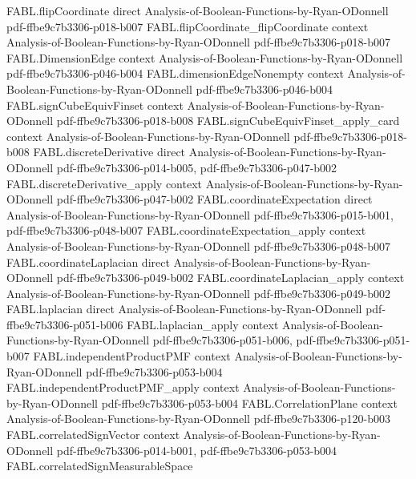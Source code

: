 \begin{theorem}
\proofstep
  {FABL.flipCoordinate}
  {direct}
  {Analysis-of-Boolean-Functions-by-Ryan-ODonnell}
  {pdf-ffbe9c7b3306-p018-b007}
\proofstep
  {FABL.flipCoordinate_flipCoordinate}
  {context}
  {Analysis-of-Boolean-Functions-by-Ryan-ODonnell}
  {pdf-ffbe9c7b3306-p018-b007}
\proofstep
  {FABL.DimensionEdge}
  {context}
  {Analysis-of-Boolean-Functions-by-Ryan-ODonnell}
  {pdf-ffbe9c7b3306-p046-b004}
\proofstep
  {FABL.dimensionEdgeNonempty}
  {context}
  {Analysis-of-Boolean-Functions-by-Ryan-ODonnell}
  {pdf-ffbe9c7b3306-p046-b004}
\proofstep
  {FABL.signCubeEquivFinset}
  {context}
  {Analysis-of-Boolean-Functions-by-Ryan-ODonnell}
  {pdf-ffbe9c7b3306-p018-b008}
\proofstep
  {FABL.signCubeEquivFinset_apply_card}
  {context}
  {Analysis-of-Boolean-Functions-by-Ryan-ODonnell}
  {pdf-ffbe9c7b3306-p018-b008}
\proofstep
  {FABL.discreteDerivative}
  {direct}
  {Analysis-of-Boolean-Functions-by-Ryan-ODonnell}
  {pdf-ffbe9c7b3306-p014-b005,
    pdf-ffbe9c7b3306-p047-b002}
\proofstep
  {FABL.discreteDerivative_apply}
  {context}
  {Analysis-of-Boolean-Functions-by-Ryan-ODonnell}
  {pdf-ffbe9c7b3306-p047-b002}
\proofstep
  {FABL.coordinateExpectation}
  {direct}
  {Analysis-of-Boolean-Functions-by-Ryan-ODonnell}
  {pdf-ffbe9c7b3306-p015-b001,
    pdf-ffbe9c7b3306-p048-b007}
\proofstep
  {FABL.coordinateExpectation_apply}
  {context}
  {Analysis-of-Boolean-Functions-by-Ryan-ODonnell}
  {pdf-ffbe9c7b3306-p048-b007}
\proofstep
  {FABL.coordinateLaplacian}
  {direct}
  {Analysis-of-Boolean-Functions-by-Ryan-ODonnell}
  {pdf-ffbe9c7b3306-p049-b002}
\proofstep
  {FABL.coordinateLaplacian_apply}
  {context}
  {Analysis-of-Boolean-Functions-by-Ryan-ODonnell}
  {pdf-ffbe9c7b3306-p049-b002}
\proofstep
  {FABL.laplacian}
  {direct}
  {Analysis-of-Boolean-Functions-by-Ryan-ODonnell}
  {pdf-ffbe9c7b3306-p051-b006}
\proofstep
  {FABL.laplacian_apply}
  {context}
  {Analysis-of-Boolean-Functions-by-Ryan-ODonnell}
  {pdf-ffbe9c7b3306-p051-b006,
    pdf-ffbe9c7b3306-p051-b007}
\proofstep
  {FABL.independentProductPMF}
  {context}
  {Analysis-of-Boolean-Functions-by-Ryan-ODonnell}
  {pdf-ffbe9c7b3306-p053-b004}
\proofstep
  {FABL.independentProductPMF_apply}
  {context}
  {Analysis-of-Boolean-Functions-by-Ryan-ODonnell}
  {pdf-ffbe9c7b3306-p053-b004}
\proofstep
  {FABL.CorrelationPlane}
  {context}
  {Analysis-of-Boolean-Functions-by-Ryan-ODonnell}
  {pdf-ffbe9c7b3306-p120-b003}
\proofstep
  {FABL.correlatedSignVector}
  {context}
  {Analysis-of-Boolean-Functions-by-Ryan-ODonnell}
  {pdf-ffbe9c7b3306-p014-b001,
    pdf-ffbe9c7b3306-p053-b004}
\proofstep
  {FABL.correlatedSignMeasurableSpace}

\end{theorem}
